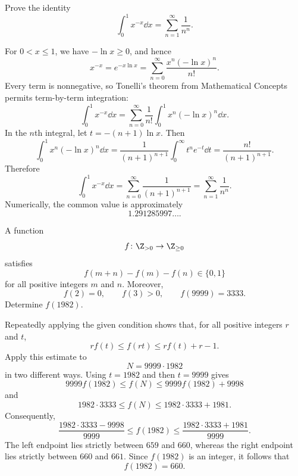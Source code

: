     \begin{expectedproblem}
        Prove the identity
        \[
            \int_0^1 x^{-x}\dd x
            =
            \sum_{n=1}^{\infty}\frac{1}{n^n}.
        \]
    \end{expectedproblem}

    \begin{solution}
        For $0<x\leq1$, we have $-\ln x\geq0$, and hence
        \[
            x^{-x}
            =
            e^{-x\ln x}
            =
            \sum_{n=0}^{\infty}
            \frac{x^n(-\ln x)^n}{n!}.
        \]
        Every term is nonnegative, so Tonelli's theorem from Mathematical
        Concepts permits term-by-term integration:
        \[
            \int_0^1x^{-x}\dd x
            =
            \sum_{n=0}^{\infty}
            \frac{1}{n!}
            \int_0^1x^n(-\ln x)^n\dd x.
        \]
        In the $n$th integral, let $t=-(n+1)\ln x$. Then
        \[
            \int_0^1x^n(-\ln x)^n\dd x
            =
            \frac{1}{(n+1)^{n+1}}
            \int_0^\infty t^ne^{-t}\dd t
            =
            \frac{n!}{(n+1)^{n+1}}.
        \]
        Therefore
        \[
            \int_0^1x^{-x}\dd x
            =
            \sum_{n=0}^{\infty}\frac{1}{(n+1)^{n+1}}
            =
            \boxed{\sum_{n=1}^{\infty}\frac{1}{n^n}}.
        \]
        Numerically, the common value is approximately
        \[
            1.291285997\ldots.
        \]
    \end{solution}

    \begin{expectedproblem}[1982 IMO]
        A function
        \[
            f\colon\Z_{>0}\to\Z_{\geq0}
        \]
        satisfies
        \[
            f(m+n)-f(m)-f(n)\in\{0,1\}
        \]
        for all positive integers $m$ and $n$. Moreover,
        \[
            f(2)=0,
            \qquad
            f(3)>0,
            \qquad
            f(9999)=3333.
        \]
        Determine $f(1982)$.
    \end{expectedproblem}

    \begin{solution}
        Repeatedly applying the given condition shows that, for all positive
        integers $r$ and $t$,
        \[
            r f(t)
            \leq
            f(rt)
            \leq
            r f(t)+r-1.
        \]
        Apply this estimate to
        \[
            N=9999\cdot1982
        \]
        in two different ways. Using $t=1982$ and then $t=9999$ gives
        \[
            9999f(1982)
            \leq
            f(N)
            \leq
            9999f(1982)+9998
        \]
        and
        \[
            1982\cdot3333
            \leq
            f(N)
            \leq
            1982\cdot3333+1981.
        \]
        Consequently,
        \[
            \frac{1982\cdot3333-9998}{9999}
            \leq
            f(1982)
            \leq
            \frac{1982\cdot3333+1981}{9999}.
        \]
        The left endpoint lies strictly between $659$ and $660$, whereas the
        right endpoint lies strictly between $660$ and $661$. Since
        $f(1982)$ is an integer, it follows that
        \[
            \boxed{f(1982)=660}.
        \]
    \end{solution}

